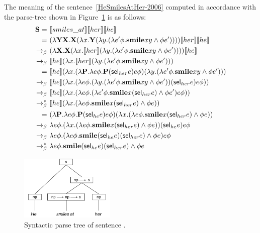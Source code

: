 \begin{example} \label{ex:2006:HeSmilesAtHer} The meaning of the sentence~\eqref{HeSmilesAtHer-2006} computed in accordance with the parse-tree shown in Figure~\ref{fig:ptS3-2006}  is as follows:
\begin{align}
\S = \ & \I{smiles\_at} \I{her} \I{he} \notag \\
 = \ & (\lambda \Y2 \X2. \X2( \lambda \x1. \Y2 (\lambda \y1. ( \lambda e' \phi. \textbf{smile} \x1 \y1 \land \phi e' ))) )  \I{her} \I{he} \notag \\
\bconv \ & (\lambda  \X2. \X2( \lambda \x1.  \I{her}  (\lambda \y1. ( \lambda e' \phi. \textbf{smile} \x1 \y1 \land \phi e' ))) ) \I{he} \notag \\
\bconv \ &   \I{he} ( \lambda \x1.  \I{her}  (\lambda \y1. ( \lambda e' \phi. \textbf{smile} \x1 \y1 \land \phi e' ))) \notag  \\
= \ &   \I{he} ( \lambda \x1.  (\lambda \P2. \lambda e \phi. \P2 (\sel_{her}e)e\phi)  (\lambda \y1. ( \lambda e' \phi. \textbf{smile} \x1 \y1 \land \phi e' ))) \notag \\
 \bconv \ &   \I{he} ( \lambda \x1.  (\lambda e \phi.  (\lambda \y1. ( \lambda e' \phi. \textbf{smile} \x1 \y1 \land \phi e' )) (\sel_{her}e)e\phi) ) \notag \\
  \bconv \ &   \I{he} ( \lambda \x1.  (\lambda e \phi.   ( \lambda e' \phi. \textbf{smile} \x1  (\sel_{her}e) \land \phi e' ) e\phi) ) \notag \\
 \bred \ &   \I{he} ( \lambda \x1.  (\lambda e \phi.  \textbf{smile} \x1  (\sel_{her}e) \land \phi e) ) \notag \\
  = \ &  (\lambda \P2. \lambda e \phi. \P2 (\sel_{he}e)e\phi) ( \lambda \x1.  (\lambda e \phi.  \textbf{smile} \x1  (\sel_{her}e) \land \phi e) ) \notag \\
\bconv \ & \lambda e \phi. ( \lambda \x1.  (\lambda e \phi.  \textbf{smile} \x1  (\sel_{her}e) \land \phi e) )  (\sel_{he}e)e\phi \notag \\
\bconv \ & \lambda e \phi.   (\lambda e \phi.  \textbf{smile}  (\sel_{he}e)  (\sel_{her}e) \land \phi e) e\phi \notag \\
\bred \ & \lambda e \phi.   \textbf{smile}  (\sel_{he}e)  (\sel_{her}e) \land \phi e \label{eq:2006:HeSmilesAtHer}
\end{align}
\end{example}

\begin{figure}[h]
 \centering
    \includegraphics[width=0.4\textwidth]{images/HeSmilesatHer.pdf}
\caption{Syntactic parse tree of sentence .} \label{fig:ptS3-2006}
\end{figure}

